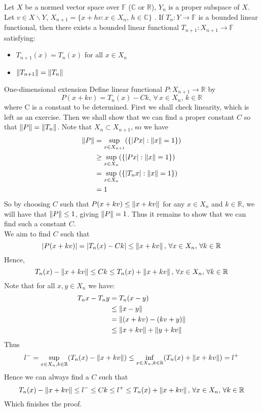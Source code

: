 \begin{lemma}\label{ODEX}\rm\nextline
	Let $X$ be a normed vector space over $\mathbb F$ ($\mathbb{C}$ or $\mathbb{R}$), $Y_n$ is a proper subspace of $X$. Let $v\in X\backslash Y$, $X_{n+1}=\{x+hv:x\in X_n,\,h\in\mathbb{C}\}$
	. If $T_n:Y\xrightarrow{}\mathbb{F}$ is a bounded linear functional, then there exists a bounded linear functional $T_{n+1}:X_{n+1}\xrightarrow{}\mathbb{F}$ satisfying:
	\begin{itemize}
		\item $T_{n+1}(x)=T_n(x)$ for all $x\in X_n$
		\item $\left\|{T_{n+1}}\right\|=\left\|{T_n}\right\|$
	\end{itemize}
	\begin{pf}{One-dimensional extension}{}
	Define linear functional $P:X_{n+1}\xrightarrow{}\mathbb{R}$ by
	$$
		P(x+kv)=T_n(x)-Ck,\,\forall\,x\in X_n,\,k\in\mathbb{R}
	$$
	where C is a constant to be determined.
	First we shall check linearity, which is left as an exercise.
	Then we shall show that we can find a proper constant $C$ so that $\left\|{P}\right\|=\left\|{T_n}\right\|$. Note that $X_n\subset X_{n+1}$, so we have
	\begin{equation}
		\begin{split}
			\left\|{P}\right\|&=\sup_{x\in X_{n+1}}(\{|Px|:\left\|{x}\right\|=1\})\\
			&\geq\sup_{x\in X_{n}}(\{|Px|:\left\|{x}\right\|=1\})\\
			&=\sup_{x\in X_{n}}(\{|T_nx|:\left\|{x}\right\|=1\})\\
			&=1
		\end{split}
	\end{equation}
	So by choosing $C$ such that $P(x+kv)\leq \left\|{x+kv}\right\|$ for any $x\in X_n$ and $k\in \mathbb{R}$, we will have that $\left\|{P}\right\|\leq 1$, giving $\left\|{P}\right\|=1$. Thus it remains to show that we can find such a constant $C$.\\
	We aim to find $C$ such that
	$$
		|P(x+kv)|=|T_n(x)-Ck|\leq \left\|{x+kv}\right\|,\,\forall x\in X_n,\,\forall k\in\mathbb{R}
	$$
	Hence,
	$$
		T_n(x)-\left\|{x+kv}\right\|\leq Ck\leq T_n(x)+\left\|{x+kv}\right\|,\,\forall x\in X_n,\,\forall k\in\mathbb{R}
	$$
	Note that for all $x,y\in X_n$ we have:
	\begin{equation}
		\begin{split}
			T_nx-T_ny&=T_n(x-y)\\
			&\leq \left\|{x-y}\right\|\\
			&=\left\|{(x+kv)-(kv+y)}\right\|\\
			&\leq\left\|{x+kv}\right\|+\left\|{y+kv}\right\|
		\end{split}
	\end{equation}
	Thus
	$$
		l^-=\sup_{x\in X_n,k\in\mathbb{R}}(T_n(x)-\left\|{x+kv}\right\|)\leq  \inf_{x\in X_n,k\in\mathbb{R}}(T_n(x)+\left\|{x+kv}\right\|)=l^+
	$$
	Hence we can always find a $C$ such that
	$$
		T_n(x)-\left\|{x+kv}\right\|\leq l^-\leq Ck\leq l^+ \leq T_n(x)+\left\|{x+kv}\right\|,\,\forall x\in X_n,\,\forall k\in\mathbb{R}
	$$
	Which finishes the proof.
\end{pf}
\end{lemma}

